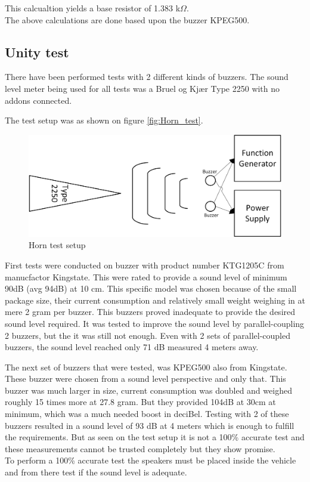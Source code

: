This calcualtion yields a base resistor of 1.383 k$\Omega$.\\
The above calculations are done based upon the buzzer KPEG500.

\subsection{Unity test}
There have been performed tests with 2 different kinds of buzzers. The sound level meter being used for all tests was a Bruel og Kjær Type 2250 \cite{BK2250} with no addons connected.

The test setup was as shown on figure \vref{fig:Horn_test}. 

\begin{figure}[H]
	\centering
	\includegraphics[width=0.7\linewidth]{Hardware/Pictures/Horn_test}
	\caption{Horn test setup}
	\label{fig:Horn_test}
\end{figure}

First tests were conducted on buzzer with product number KTG1205C\cite{KTG1205} from manucfactor Kingstate. This were rated to provide a sound level of minimum 90dB (avg 94dB) at 10 cm. This specific model was chosen because of the small package size, their current consumption and relatively small weight weighing in at mere 2 gram per buzzer. This buzzers proved inadequate to provide the desired sound level required. It was tested to improve the sound level by parallel-coupling 2 buzzers, but the it was still not enough. Even with 2 sets of parallel-coupled buzzers, the sound level reached only 71 dB measured 4 meters away.

The next set of buzzers that were tested, was KPEG500\cite{KPEG500} also from Kingstate. These buzzer were chosen from a sound level perspective and only that. This buzzer was much larger in size, current consumption was doubled and weighed roughly 15 times more at 27.8 gram. But they provided 104dB at 30cm at minimum, which was a much needed boost in deciBel. Testing with 2 of these buzzers resulted in a sound  level of 93 dB at 4 meters which is enough to fulfill the requirements. But as seen on the test setup it is not a 100\% accurate test and these measurements cannot be trusted completely but they show promise. \\
To perform a 100\% accurate test the speakers must be placed inside the vehicle and from there test if the sound level is adequate.

